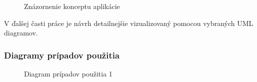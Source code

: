 \begin{figure}[hbt!]
  \centering  
  \def\stackalignment{c}
           {\scriptsize}
	\caption{Znázornenie konceptu aplikácie}  
  \label{app-diagram}
\end{figure}

V ďalšej časti práce je návrh detailnejšie vizualizovaný pomocou vybraných UML diagramov. 

\pagebreak

\subsubsection{Diagramy prípadov použitia}
\begin{figure}[hbt!]
  \centering  
  \def\stackalignment{c}
           {\scriptsize}
	\caption{Diagram prípadov použitia 1}
	\label{usecase1}
\end{figure}

